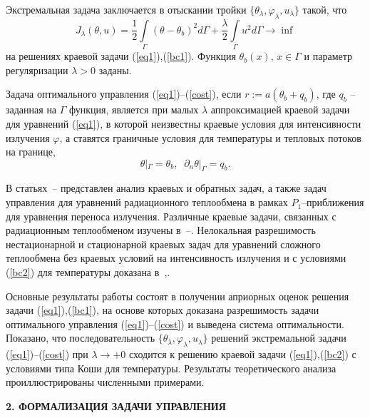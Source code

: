 \documentclass[12pt]{article}
\begin{document}
    Экстремальная задача заключается в отыскании тройки $\{\theta_\lambda,\varphi_\lambda,u_\lambda\}$
    такой, что
    \begin{equation}
        \label{cost}
        J_\lambda(\theta, u) = \frac{1}{2}\int\limits_\Gamma (\theta - \theta_b)^2d\Gamma +
        \frac{\lambda}{2}\int\limits_\Gamma u^2d\Gamma \rightarrow\inf
    \end{equation}
    на решениях краевой задачи (\ref{eq1}),(\ref{bc1}).
    Функция $\theta_b(x),\, x\in\Gamma$  и параметр регуляризации $\lambda>0$ заданы.

    Задача оптимального управления (\ref{eq1})--(\ref{cost}), если
    $r:=a(\theta_b+q_b)$, где $q_b$ -- заданная на $\Gamma$ функция,
    является при малых $\lambda$ аппроксимацией краевой задачи для уравнений (\ref{eq1}), в которой
    неизвестны краевые условия для интенсивности излучения $\varphi$, а ставятся
    граничные условия для температуры и тепловых потоков на границе,
    \begin{equation}
        \label{bc2}
        \theta|_\Gamma = \theta_b,\;\;
        \partial_n\theta|_\Gamma = q_b.
    \end{equation}


    В статьях~\cite{Pinnau07}--\cite{JMAA-19} представлен анализ
    краевых и обратных задач, а также задач управления
    для уравнений радиационного теплообмена
    в рамках $P_1$--приближения для уравнения
    переноса излучения.
    Различные краевые задачи, связанных с радиационным теплообменом
    изучены в~\cite{AmosA05}--\cite{Amosov18}.
    Нелокальная разрешимость
    нестационарной и стационарной краевых задач для уравнений сложного теплообмена
    без краевых условий на интенсивность излучения и
    с условиями (\ref{bc2}) для температуры доказана в~\cite{CNSNS19},\cite{CMMP20}.


    Основные результаты работы состоят в получении априорных оценок
    решения задачи (\ref{eq1}),(\ref{bc1}), на основе которых
    доказана разрешимость задачи оптимального управления
    (\ref{eq1})--(\ref{cost}) и выведена система оптимальности.
    Показано, что
    последовательность $\{\theta_\lambda,\varphi_\lambda,u_\lambda\}$ решений
    экстремальной задачи (\ref{eq1})--(\ref{cost}) при $\lambda\to +0$
    сходится к решению краевой задачи (\ref{eq1}),(\ref{bc2}) с условиями типа Коши для температуры.
    Результаты теоретического анализа проиллюстрированы численными примерами.


    \begin{center}
        \textbf{2. ФОРМАЛИЗАЦИЯ ЗАДАЧИ УПРАВЛЕНИЯ}
    \end{center}
\end{document}
